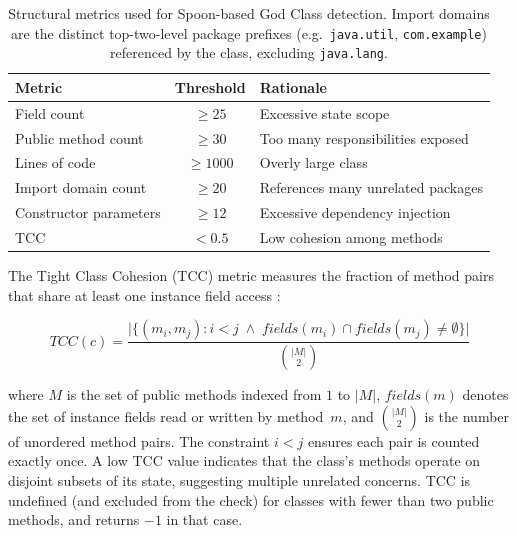 \begin{table}[htbp]
    \centering
    \footnotesize
    \begin{tabular}{|l|c|p{6cm}|}
        \hline
        \textbf{Metric} & \textbf{Threshold} & \textbf{Rationale} \\
        \hline\hline
        Field count            & $\geq 25$  & Excessive state scope \\
        \hline
        Public method count    & $\geq 30$  & Too many responsibilities exposed \\
        \hline
        Lines of code          & $\geq 1000$& Overly large class \\
        \hline
        Import domain count    & $\geq 20$  & References many unrelated packages \\
        \hline
        Constructor parameters & $\geq 12$  & Excessive dependency injection \\
        \hline
        TCC                    & $< 0.5$    & Low cohesion among methods \\
        \hline
    \end{tabular}
    \caption{Structural metrics used for Spoon-based God Class detection. Import domains are the distinct top-two-level package prefixes (e.g.\ \texttt{java.util}, \texttt{com.example}) referenced by the class, excluding \texttt{java.lang}.}
    \label{tab:god-class-metrics}
\end{table}

The Tight Class Cohesion (TCC) metric measures the fraction of method pairs that share at least one instance field access \cite{Bieman1995}:

\begin{equation}
    \mathit{TCC}(c) = \frac{\bigl|\{(m_i, m_j) : i < j \;\wedge\; \mathit{fields}(m_i) \cap \mathit{fields}(m_j) \neq \emptyset\}\bigr|}{{\binom{|M|}{2}}}
    \label{eq:tcc}
\end{equation}

\noindent where $M$ is the set of public methods indexed from $1$ to $|M|$, $\mathit{fields}(m)$ denotes the set of instance fields read or written by method~$m$, and $\binom{|M|}{2}$ is the number of unordered method pairs. The constraint $i < j$ ensures each pair is counted exactly once. A low TCC value indicates that the class's methods operate on disjoint subsets of its state, suggesting multiple unrelated concerns. TCC is undefined (and excluded from the check) for classes with fewer than two public methods, and returns $-1$ in that case.

